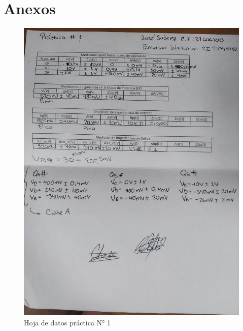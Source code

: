 \section{Anexos}

\begin{figure}[ht]
    \centering
    \includegraphics[width=1.0\textwidth]{src/images/p1/p1-hoja-de-datos.jpg}
    \caption{Hoja de datos práctica N° 1}
    \label{fig:hoja-de-datos-p1}
\end{figure}

